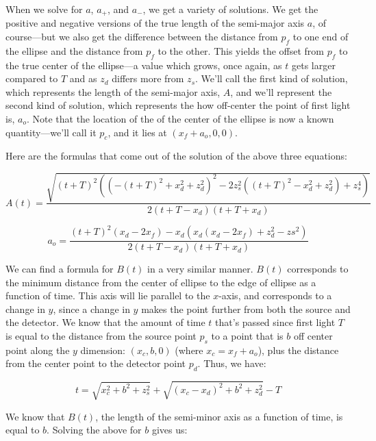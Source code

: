 \documentclass[11pt]{article}
\begin{document}
When we solve for $a$, $a_+$, and $a_-$, we get a variety of solutions. We get the positive and negative versions of the true length of the semi-major axis $a$, of course---but we also get the difference between the distance from $p_f$ to one end of the ellipse and the distance from $p_f$ to the other. This yields the offset from $p_f$ to the true center of the ellipse---a value which grows, once again, as $t$ gets larger compared to $T$ and as $z_d$ differs more from $z_s$. We'll call the first kind of solution, which represents the length of the semi-major axis, $A$, and we'll represent the second kind of solution, which represents the how off-center the point of first light is, $a_o$. Note that the location of the of the center of the ellipse is now a known quantity---we'll call it $p_c$, and it lies at $(x_f + a_o, 0, 0)$.

Here are the formulas that come out of the solution of the above three equations:

\begin{equation}
A(t) = \frac{\sqrt{(t+T)^2((-(t+T)^2 + x_d^2 + z_d^2)^2 - 2z_s^2((t+T)^2-x_d^2+z_d^2)+ z_s^4)}}{2(t+T-x_d)(t+T+x_d)}
\end{equation}

\begin{equation}
a_o = \frac{(t+T)^2(x_d-2x_f) - x_d(x_d(x_d-2x_f) + z_d^2 - zs^2)}{2(t+T-x_d)(t+T+x_d)}
\end{equation}

We can find a formula for $B(t)$ in a very similar manner. $B(t)$ corresponds to the minimum distance from the center of ellipse to the edge of ellipse as a function of time. This axis will lie parallel to the $x$-axis, and corresponds to a change in $y$, since a change in $y$ makes the point further from both the source and the detector. We know that the amount of time $t$ that's passed since first light $T$ is equal to the distance from the source point $p_s$ to a point that is $b$ off center point along the $y$ dimension: $(x_c, b, 0)$ (where $x_c = x_f + a_o$), plus the distance from the center point to the detector point $p_d$. Thus, we have:

\begin{equation}
    t = \sqrt{x_c^2 + b^2 + z_s^2} + \sqrt{(x_c-x_d)^2 + b^2 + z_d^2} - T
\end{equation}

We know that $B(t)$, the length of the semi-minor axis as a function of time, is equal to $b$. Solving the above for $b$ gives us:
\end{document}
